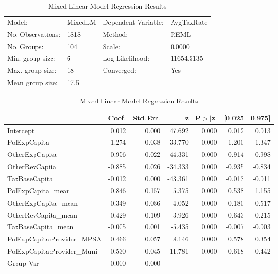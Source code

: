 \begin{table}[H]
\caption{Mixed Linear Model Regression Results}
\label{}
\begin{center}
\begin{tabular}{llll}
\hline
Model:            & MixedLM & Dependent Variable: & AvgTaxRate  \\
No. Observations: & 1818    & Method:             & REML        \\
No. Groups:       & 104     & Scale:              & 0.0000      \\
Min. group size:  & 6       & Log-Likelihood:     & 11654.5135  \\
Max. group size:  & 18      & Converged:          & Yes         \\
Mean group size:  & 17.5    &                     &             \\
\hline
\end{tabular}
\end{center}

\begin{center}
\begin{tabular}{lrrrrrr}
\hline
                            &  Coef. & Std.Err. &       z & P$> |$z$|$ & [0.025 & 0.975]  \\
\hline
Intercept                   &  0.012 &    0.000 &  47.692 &       0.000 &  0.012 &  0.013  \\
PolExpCapita                &  1.274 &    0.038 &  33.770 &       0.000 &  1.200 &  1.347  \\
OtherExpCapita              &  0.956 &    0.022 &  44.331 &       0.000 &  0.914 &  0.998  \\
OtherRevCapita              & -0.885 &    0.026 & -34.333 &       0.000 & -0.935 & -0.834  \\
TaxBaseCapita               & -0.012 &    0.000 & -43.361 &       0.000 & -0.013 & -0.011  \\
PolExpCapita\_mean          &  0.846 &    0.157 &   5.375 &       0.000 &  0.538 &  1.155  \\
OtherExpCapita\_mean        &  0.349 &    0.086 &   4.052 &       0.000 &  0.180 &  0.517  \\
OtherRevCapita\_mean        & -0.429 &    0.109 &  -3.926 &       0.000 & -0.643 & -0.215  \\
TaxBaseCapita\_mean         & -0.005 &    0.001 &  -5.435 &       0.000 & -0.007 & -0.003  \\
PolExpCapita:Provider\_MPSA & -0.466 &    0.057 &  -8.146 &       0.000 & -0.578 & -0.354  \\
PolExpCapita:Provider\_Muni & -0.530 &    0.045 & -11.781 &       0.000 & -0.618 & -0.442  \\
Group Var                   &  0.000 &    0.000 &         &             &        &         \\
\hline
\end{tabular}
\end{center}
\end{table}
\bigskip

